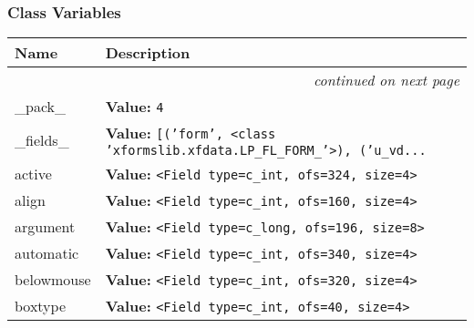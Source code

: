 
  \subsubsection{Class Variables}

    \vspace{-1cm}
\hspace{\varindent}\begin{longtable}{|p{\varnamewidth}|p{\vardescrwidth}|l}
\cline{1-2}
\cline{1-2} \centering \textbf{Name} & \centering \textbf{Description}& \\
\cline{1-2}
\endhead\cline{1-2}\multicolumn{3}{r}{\small\textit{continued on next page}}\\\endfoot\cline{1-2}
\endlastfoot\raggedright \_\-p\-a\-c\-k\-\_\- & \raggedright \textbf{Value:} 
{\tt 4}&\\
\cline{1-2}
\raggedright \_\-f\-i\-e\-l\-d\-s\-\_\- & \raggedright \textbf{Value:} 
{\tt \texttt{[}\texttt{(}\texttt{'}\texttt{form}\texttt{'}\texttt{, }{\textless}class 'xformslib.xfdata.LP\_FL\_FORM\_'{\textgreater}\texttt{)}\texttt{, }\texttt{(}\texttt{'}\texttt{u\_vd}\texttt{...}}&\\
\cline{1-2}
\raggedright a\-c\-t\-i\-v\-e\- & \raggedright \textbf{Value:} 
{\tt {\textless}Field type=c\_int, ofs=324, size=4{\textgreater}}&\\
\cline{1-2}
\raggedright a\-l\-i\-g\-n\- & \raggedright \textbf{Value:} 
{\tt {\textless}Field type=c\_int, ofs=160, size=4{\textgreater}}&\\
\cline{1-2}
\raggedright a\-r\-g\-u\-m\-e\-n\-t\- & \raggedright \textbf{Value:} 
{\tt {\textless}Field type=c\_long, ofs=196, size=8{\textgreater}}&\\
\cline{1-2}
\raggedright a\-u\-t\-o\-m\-a\-t\-i\-c\- & \raggedright \textbf{Value:} 
{\tt {\textless}Field type=c\_int, ofs=340, size=4{\textgreater}}&\\
\cline{1-2}
\raggedright b\-e\-l\-o\-w\-m\-o\-u\-s\-e\- & \raggedright \textbf{Value:} 
{\tt {\textless}Field type=c\_int, ofs=320, size=4{\textgreater}}&\\
\cline{1-2}
\raggedright b\-o\-x\-t\-y\-p\-e\- & \raggedright \textbf{Value:} 
{\tt {\textless}Field type=c\_int, ofs=40, size=4{\textgreater}}&\\
\cline{1-2}

\end{longtable}
